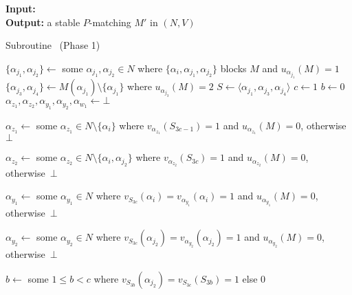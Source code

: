 \begin{algorithm}[b!]
\textbf{Input:}\\
\textbf{Output:} a stable $P$-matching $M'$ in $(N, V)$
\smallskip
\begin{algorithmic}
\caption{Subroutine~ (Phase 1) \label{alg:threed_sr_as_almostthere_algo_phase1}} 

\State $\{ \alpha_{j_1}, \alpha_{j_2} \} \gets$ some $\alpha_{j_1}, \alpha_{j_2}\in N$ where $\{ \alpha_i, \alpha_{j_1}, \alpha_{j_2}\}$ blocks $M$ and $u_{\alpha_{j_1}}(M)=1$
\State $\{ \alpha_{j_3}, \alpha_{j_4} \} \gets M(\alpha_{j_1}) \setminus \{ \alpha_{{j_1}} \}$ where $u_{\alpha_{{j_3}}}(M)=2$
\State $S \gets \langle \alpha_{j_1}, \alpha_{j_3}, \alpha_{j_4} \rangle$
\State $c \gets 1$
\State $b \gets 0$
\State $\alpha_{z_1}, \alpha_{z_2}, \alpha_{y_1}, \alpha_{y_2}, \alpha_{w_1} \gets \bot$

\smallskip


\State $\alpha_{z_1} \gets$ some $\alpha_{z_1}\in N \setminus \{ \alpha_i \}$ where $v_{\alpha_{z_1}}(S_{3c-1})=1 $ and $u_{\alpha_{z_1}}(M)=0$, otherwise~$\bot$

\vspace*{1.5pt}

\State $\alpha_{z_2} \gets$ some $\alpha_{z_2}\in N \setminus \{ \alpha_i, \alpha_{j_2} \}$ where $v_{\alpha_{z_2}}(S_{3c})=1 $ and $ u_{\alpha_{z_2}}(M)=0$, otherwise~$\bot$

\vspace*{1.5pt}

\State $\alpha_{y_1} \gets$ some $\alpha_{y_1}\in N$ where $v_{S_{3c}}(\alpha_i)=v_{\alpha_{y_1}}(\alpha_i)=1 $ and $u_{\alpha_{y_1}}(M)=0$, otherwise~$\bot$

\vspace*{1.5pt}

\State $\alpha_{y_2} \gets$ some $\alpha_{y_2}\in N$ where $v_{S_{3c}}(\alpha_{j_2})=v_{\alpha_{y_2}}(\alpha_{j_2})=1 $ and $u_{\alpha_{y_2}}(M)=0$, otherwise~$\bot$

\vspace*{1.5pt}

\State $b \gets$ some $1 \leq b < c$ where $v_{S_{3b}}(\alpha_{j_2})=v_{S_{3c}}(S_{3b})=1$ else $0$


\end{algorithmic}
\end{algorithm}
